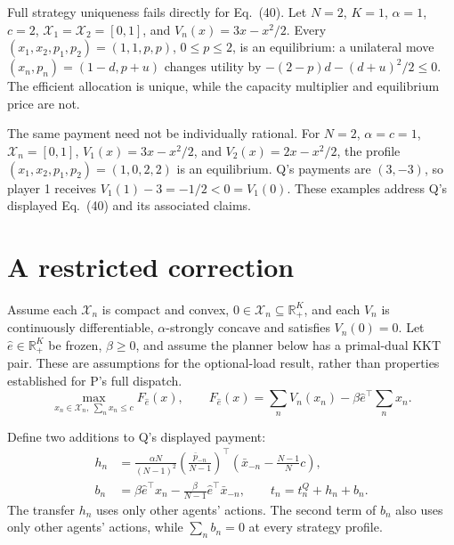 \documentclass{article}
\begin{document}
Full strategy uniqueness fails directly for Eq.~(40). Let \(N=2\), \(K=1\), \(\alpha=1\), \(c=2\), \(\mathcal X_1=\mathcal X_2=[0,1]\), and \(V_n(x)=3x-x^2/2\). Every \((x_1,x_2,p_1,p_2)=(1,1,p,p)\), \(0\leq p\leq2\), is an equilibrium: a unilateral move \((x_n,p_n)=(1-d,p+u)\) changes utility by \(-(2-p)d-(d+u)^2/2\leq0\). The efficient allocation is unique, while the capacity multiplier and equilibrium price are not. %

The same payment need not be individually rational. For \(N=2\), \(\alpha=c=1\), \(\mathcal X_n=[0,1]\), \(V_1(x)=3x-x^2/2\), and \(V_2(x)=2x-x^2/2\), the profile \((x_1,x_2,p_1,p_2)=(1,0,2,2)\) is an equilibrium. Q's payments are \((3,-3)\), so player 1 receives \(V_1(1)-3=-1/2<0=V_1(0)\). These examples address Q's displayed Eq.~(40) and its associated claims. %

\section{A restricted correction}

Assume each \(\mathcal X_n\) is compact and convex, \(0\in\mathcal X_n\subseteq\mathbb R_+^K\), and each \(V_n\) is continuously differentiable, \(\alpha\)-strongly concave and satisfies \(V_n(0)=0\). Let \(\hat e\in\mathbb R_+^K\) be frozen, \(\beta\geq0\), and assume the planner below has a primal-dual KKT pair. These are assumptions for the optional-load result, rather than properties established for P's full dispatch. %
\[
\max_{x_n\in\mathcal X_n,\ \sum_n x_n\leq c}
F_{\hat e}(x),\qquad
F_{\hat e}(x)=\sum_n V_n(x_n)-\beta\hat e^\top\sum_n x_n.
\tag{1}\label{eq:planner}
\]

Define two additions to Q's displayed payment:
\begin{align}
h_n&=\frac{\alpha N}{(N-1)^2}
\left(\frac{\bar p_{-n}}{N-1}\right)^\top
\left(\bar x_{-n}-\frac{N-1}{N}c\right),\label{eq:repair}\\
b_n&=\beta\hat e^\top x_n
-\frac{\beta}{N-1}\hat e^\top\bar x_{-n},\qquad
t_n=t_n^Q+h_n+b_n.\label{eq:carbon}
\end{align}
The transfer \(h_n\) uses only other agents' actions. The second term of \(b_n\) also uses only other agents' actions, while \(\sum_n b_n=0\) at every strategy profile. %
\end{document}
